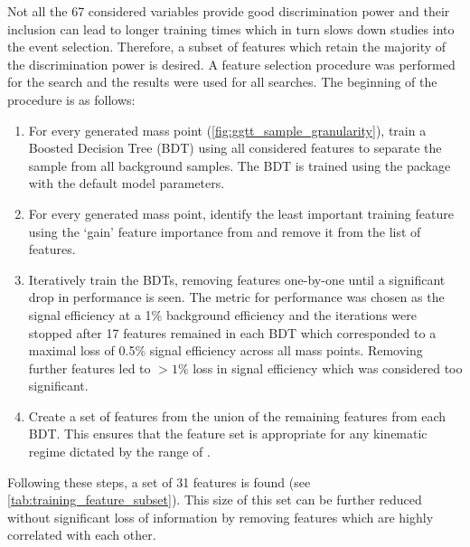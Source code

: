 Not all the 67 considered variables provide good discrimination power and their inclusion can lead to longer training times which in turn slows down studies into the event selection. Therefore, a subset of features which retain the majority of the discrimination power is desired. A feature selection procedure was performed for the \XTwoHH search and the results were used for all searches. The beginning of the procedure is as follows:
\begin{enumerate}
    \item For every generated mass point (\cref{fig:ggtt_sample_granularity}), train a Boosted Decision Tree (BDT) using all considered features to separate the \XTwoHH sample from all background samples. The BDT is trained using the \XGBoost package~\cite{Chen:2016btl} with the default model parameters.
    \item For every generated mass point, identify the least important training feature using the `gain' feature importance from \XGBoost and remove it from the list of features.
    \item Iteratively train the BDTs, removing features one-by-one until a significant drop in performance is seen. The metric for performance was chosen as the signal efficiency at a 1\% background efficiency and the iterations were stopped after 17 features remained in each BDT which corresponded to a maximal loss of 0.5\% signal efficiency across all mass points. Removing further features led to $>1\%$ loss in signal efficiency which was considered too significant.
    \item Create a set of features from the union of the remaining features from each BDT. This ensures that the feature set is appropriate for any kinematic regime dictated by the range of \mX.
\end{enumerate}
Following these steps, a set of 31 features is found (see \cref{tab:training_feature_subset}). This size of this set can be further reduced without significant loss of information by removing features which are highly correlated with each other. 

